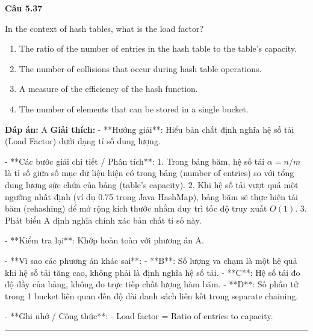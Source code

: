 \documentclass[11pt,a4paper]{article}
\newenvironment{question}[1]{%
  \par\vspace{1em}\noindent\textbf{\large Câu #1}\par\vspace{0.4em}
}{%
  \par\vspace{1em}\hrule\vspace{0.6em}
}
\newenvironment{choices}{%
  \begin{enumerate}[label=\textbf{\Alph*.},leftmargin=2.2em,itemsep=2pt,topsep=3pt]
}{%
  \end{enumerate}
}
\newcommand{\choice}{\item}
\begin{document}
\begin{question}{5.37}
In the context of hash tables, what is the load factor?
\begin{choices}
\choice The ratio of the number of entries in the hash table to the table's capacity.
\choice The number of collisions that occur during hash table operations.
\choice A measure of the efficiency of the hash function.
\choice The number of elements that can be stored in a single bucket.
\end{choices}
\textbf{Đáp án:} A
\textbf{Giải thích:} - **Hướng giải**:
  Hiểu bản chất định nghĩa hệ số tải (Load Factor) dưới dạng tỉ số dung lượng.

- **Các bước giải chi tiết / Phân tích**:
  1. Trong bảng băm, hệ số tải \(\alpha = n / m\) là tỉ số giữa số mục dữ liệu hiện có trong bảng (number of entries) so với tổng dung lượng sức chứa của bảng (table's capacity).
  2. Khi hệ số tải vượt quá một ngưỡng nhất định (ví dụ 0.75 trong Java HashMap), bảng băm sẽ thực hiện tái băm (rehashing) để mở rộng kích thước nhằm duy trì tốc độ truy xuất \(O(1)\).
  3. Phát biểu A định nghĩa chính xác bản chất tỉ số này.

- **Kiểm tra lại**:
  Khớp hoàn toàn với phương án A.

- **Vì sao các phương án khác sai**:
  - **B**: Số lượng va chạm là một hệ quả khi hệ số tải tăng cao, không phải là định nghĩa hệ số tải.
  - **C**: Hệ số tải đo độ đầy của bảng, không đo trực tiếp chất lượng hàm băm.
  - **D**: Số phần tử trong 1 bucket liên quan đến độ dài danh sách liên kết trong separate chaining.

- **Ghi nhớ / Công thức**:
  - Load factor = Ratio of entries to capacity.
\end{question}
\end{document}
